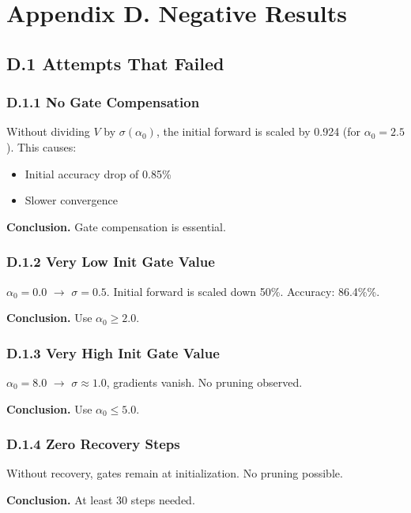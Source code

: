 
\section{Appendix D. Negative Results}

\subsection{D.1 Attempts That Failed}

\subsubsection{D.1.1 No Gate Compensation}

Without dividing $V$ by $\sigma(\alpha_0)$, the initial forward is scaled 
by 0.924 (for $\alpha_0 = 2.5$). This causes:
\begin{itemize}
\item Initial accuracy drop of 0.85\%
\item Slower convergence

\end{itemize}
\textbf{Conclusion.} Gate compensation is essential.

\subsubsection{D.1.2 Very Low Init Gate Value}

$\alpha_0 = 0.0$ $\to$ $\sigma = 0.5$. Initial forward is scaled down 50\%. 
Accuracy: 86.4\%\%.

\textbf{Conclusion.} Use $\alpha_0 \geq 2.0$.

\subsubsection{D.1.3 Very High Init Gate Value}

$\alpha_0 = 8.0$ $\to$ $\sigma \approx 1.0$, gradients vanish. No pruning 
observed.

\textbf{Conclusion.} Use $\alpha_0 \leq 5.0$.

\subsubsection{D.1.4 Zero Recovery Steps}

Without recovery, gates remain at initialization. No pruning possible.

\textbf{Conclusion.} At least 30 steps needed.

